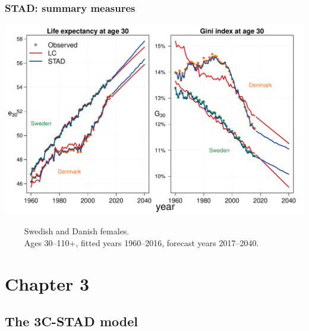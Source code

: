 \documentclass[12pt, xcolor=table]{beamer}  %
\begin{document}
\begin{frame}[noframenumbering]\frametitle{STAD: summary measures}

\vspace{-0.5cm}
	
	\begin{center}	
		\vspace{0.4cm}
		
		\includegraphics[scale=.42]{Figures/Ch2/F4_3}
		
	\end{center}

\vspace{-0.3cm}
\tiny{$\quad\quad$ Swedish and Danish females. \\ $\quad\quad$ Ages 30--110+, fitted years 1960--2016, forecast years 2017--2040.}
	
\end{frame}

\section{Chapter 3}
\subsection{The 3C-STAD model}
\end{document}
